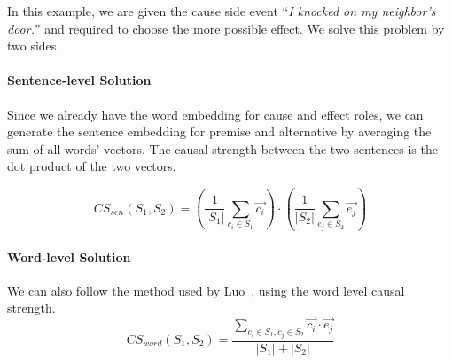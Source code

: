 In this example, we are given the cause side event ``\emph{I knocked on my neighbor's door.}'' and required to choose the more possible effect.
We solve this problem by two sides.

\paragraph{Sentence-level Solution}
Since we already have the word embedding for cause and effect roles, we can generate the sentence embedding for premise and alternative by averaging the sum of all words' vectors.
The causal strength between the two sentences is the dot product of the two vectors.

\begin{equation}
	CS_{sen}(S_1, S_2) = (\frac{1}{|S_1|}\sum_{c_i \in S_1}{\overrightarrow{c_i}}) \cdot (\frac{1}{|S_2|}{\sum_{e_j \in S_2}\overrightarrow{e_j}})
\end{equation}

\paragraph{Word-level Solution}
We can also follow the method used by Luo~\cite{luo2016commonsense}, using the word level causal strength.
\begin{equation}
	CS_{word}(S_1, S_2) = \frac{\sum_{c_i \in S_1, c_j \in S_2}{\overrightarrow{c_i} \cdot \overrightarrow{e_j}}}{|S_1|+|S_2|}
\end{equation}
